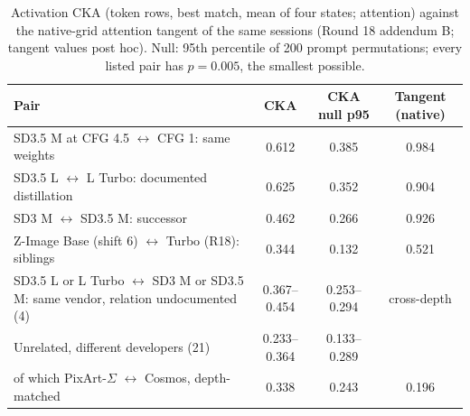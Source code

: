 \documentclass[11pt]{article}
\begin{document}
\begin{table}[htbp]
\centering\footnotesize
\caption{Activation CKA (token rows, best match, mean of four states; attention) against the native-grid attention tangent of the same sessions (Round 18 addendum B; tangent values post hoc). Null: 95th percentile of 200 prompt permutations; every listed pair has $p=0.005$, the smallest possible.}
\label{tab:cka}
\begin{tabularx}{\linewidth}{@{}Lccc@{}}
\toprule
Pair & CKA & CKA null p95 & Tangent (native)\\
\midrule
SD3.5 M at CFG 4.5 $\leftrightarrow$ CFG 1: same weights & 0.612 & 0.385 & 0.984\\
SD3.5 L $\leftrightarrow$ L Turbo: documented distillation & 0.625 & 0.352 & 0.904\\
SD3 M $\leftrightarrow$ SD3.5 M: successor & 0.462 & 0.266 & 0.926\\
Z-Image Base (shift 6) $\leftrightarrow$ Turbo (R18): siblings & 0.344 & 0.132 & 0.521\\
SD3.5 L or L Turbo $\leftrightarrow$ SD3 M or SD3.5 M: same vendor, relation undocumented (4) & 0.367--0.454 & 0.253--0.294 & cross-depth\\
Unrelated, different developers (21) & 0.233--0.364 & 0.133--0.289 & \\
\quad of which PixArt-$\Sigma$ $\leftrightarrow$ Cosmos, depth-matched & 0.338 & 0.243 & 0.196\\
\bottomrule
\end{tabularx}
\end{table}
\end{document}
